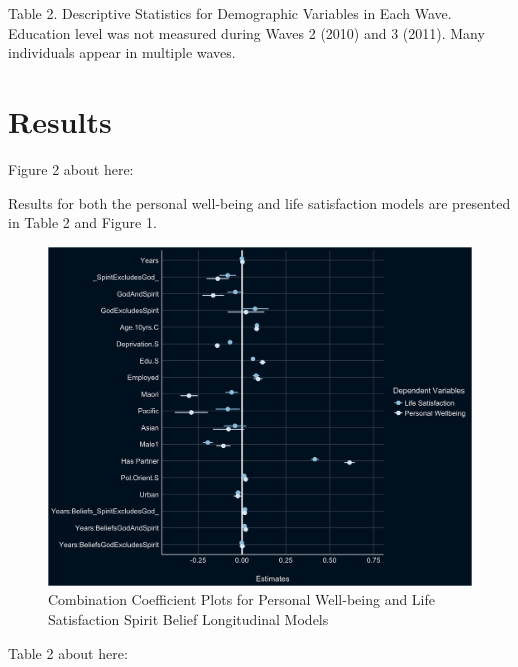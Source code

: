 \documentclass[
  english,
  man]{apa6}
\begin{document}
Table 2. Descriptive Statistics for Demographic Variables in Each Wave. Education level was not measured during Waves 2 (2010) and 3 (2011). Many individuals appear in multiple waves.

\hypertarget{results}{%
\section{Results}\label{results}}

Figure 2 about here:

Results for both the personal well-being and life satisfaction models are presented in Table 2 and Figure 1.

\begin{figure}

{\centering \includegraphics[width=6.4in]{Figs/USEcoefficientplots-1} 

}

\caption{Combination Coefficient Plots for Personal Well-being and Life Satisfaction Spirit Belief Longitudinal Models}\label{fig:unnamed-chunk-5}
\end{figure}

Table 2 about here:
\end{document}

